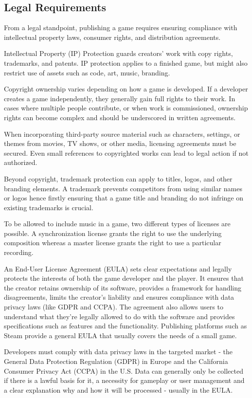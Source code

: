 \subsection{Legal Requirements}
From a legal standpoint, publishing a game requires ensuring compliance with intellectual property laws, consumer rights, and distribution agreements.

Intellectual Property (IP) Protection guards creators’ work with copy rights, trademarks, and patents. IP protection applies to a finished game, but might also restrict use of assets such as code, art, music, branding.

Copyright ownership varies depending on how a game is developed. If a developer creates a game independently, they generally gain full rights to their work. In cases where multiple people contribute, or when work is commissioned, ownership rights can become complex and should be underscored in written agreements.

When incorporating third-party source material such as characters, settings, or themes from movies, TV shows, or other media, licensing agreements must be secured. Even small references to copyrighted works can lead to legal action if not authorized.

Beyond copyright, trademark protection can apply to titles, logos, and other branding elements. A trademark prevents competitors from using similar names or logos hence firstly ensuring that a game title and branding do not infringe on existing trademarks is crucial.

To be allowed to include music in a game, two different types of licenses are possible. A synchronization license grants the right to use the underlying composition whereas a master license grants the right to use a particular recording.

An End-User License Agreement (EULA) sets clear expectations and legally protects the interests of both the game developer and the player. It ensures that the creator retains ownership of its software, provides a framework for handling disagreements, limits the creator’s liability and ensures compliance with data privacy laws (like GDPR and CCPA). The agreement also allows users to understand what they're legally allowed to do with the software and provides specifications such as features and the functionality. Publishing platforms such as Steam provide a general EULA that usually covers the needs of a small game. 

Developers must comply with data privacy laws in the targeted market - the General Data Protection Regulation (GDPR) in Europe and the California Consumer Privacy Act (CCPA) in the U.S. Data can generally only be collected if there is a lawful basis for it, a necessity for gameplay or user management and a clear explanation why and how it will be processed - usually in the EULA.

